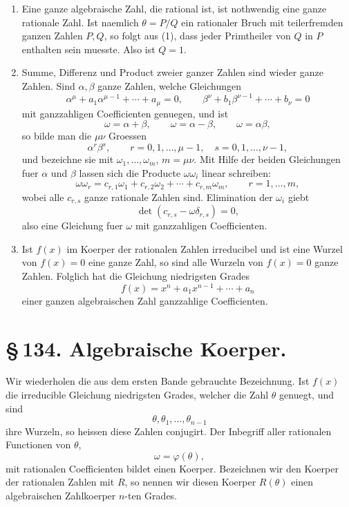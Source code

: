 \documentclass[11pt]{article}
\begin{document}
\begin{enumerate}[label=\arabic*.]
\item Eine ganze algebraische Zahl, die rational ist, ist nothwendig
eine ganze rationale Zahl. Ist naemlich \(\theta=P/Q\) ein rationaler
Bruch mit teilerfremden ganzen Zahlen \(P,Q\), so folgt aus (1), dass
jeder Primtheiler von \(Q\) in \(P\) enthalten sein muesste. Also ist
\(Q=1\).

\item Summe, Differenz und Product zweier ganzer Zahlen sind wieder
ganze Zahlen. Sind \(\alpha,\beta\) ganze Zahlen, welche Gleichungen
\[
\alpha^\mu+a_1\alpha^{\mu-1}+\cdots+a_\mu=0,\qquad
\beta^\nu+b_1\beta^{\nu-1}+\cdots+b_\nu=0
\]
mit ganzzahligen Coefficienten genuegen, und ist
\[
\omega=\alpha+\beta,\qquad \omega=\alpha-\beta,\qquad
\omega=\alpha\beta,
\]
so bilde man die \(\mu\nu\) Groessen
\[
\alpha^r\beta^s,\qquad r=0,1,\ldots,\mu-1,\quad
s=0,1,\ldots,\nu-1,
\]
und bezeichne sie mit \(\omega_1,\ldots,\omega_m\), \(m=\mu\nu\).
Mit Hilfe der beiden Gleichungen fuer \(\alpha\) und \(\beta\) lassen
sich die Producte \(\omega\omega_i\) linear schreiben:
\begin{equation}
\omega\omega_r=c_{r,1}\omega_1+c_{r,2}\omega_2+\cdots+c_{r,m}\omega_m,
\qquad r=1,\ldots,m,
\tag{2}
\end{equation}
wobei alle \(c_{r,s}\) ganze rationale Zahlen sind. Elimination der
\(\omega_i\) giebt
\begin{equation}
\det(c_{r,s}-\omega\delta_{r,s})=0,
\tag{3}
\end{equation}
also eine Gleichung fuer \(\omega\) mit ganzzahligen Coefficienten.

\item Ist \(f(x)\) im Koerper der rationalen Zahlen irreducibel und
ist eine Wurzel von \(f(x)=0\) eine ganze Zahl, so sind alle Wurzeln
von \(f(x)=0\) ganze Zahlen. Folglich hat die Gleichung niedrigsten
Grades
\begin{equation}
f(x)=x^n+a_1x^{n-1}+\cdots+a_n
\tag{4}
\end{equation}
einer ganzen algebraischen Zahl ganzzahlige Coefficienten.
\end{enumerate}

\section*{\S\,134. Algebraische Koerper.}

Wir wiederholen die aus dem ersten Bande gebrauchte Bezeichnung. Ist
\(f(x)\) die irreducible Gleichung niedrigsten Grades, welcher die
Zahl \(\theta\) genuegt, und sind
\[
\theta,\theta_1,\ldots,\theta_{n-1}
\]
ihre Wurzeln, so heissen diese Zahlen conjugirt. Der Inbegriff aller
rationalen Functionen von \(\theta\),
\[
\omega=\varphi(\theta),
\]
mit rationalen Coefficienten bildet einen Koerper. Bezeichnen wir den
Koerper der rationalen Zahlen mit \(R\), so nennen wir diesen Koerper
\(R(\theta)\) einen algebraischen Zahlkoerper \(n\)-ten Grades.
\end{document}
